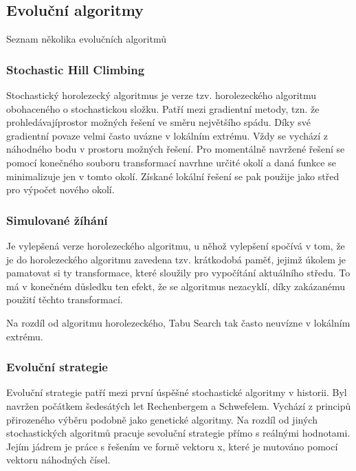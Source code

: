 \documentclass[bc,male,java,dept460]{diploma}		%
\begin{document}
\subsection{Evoluční algoritmy}
Seznam několika evolučních algoritmů

\subsubsection{Stochastic Hill Climbing}
Stochastický horolezecký algoritmus je verze tzv. horolezeckého algoritmu obohaceného o stochastickou složku. Patří mezi gradientní metody, tzn. že prohledávajíprostor možných řešení ve směru největšího spádu. Díky své gradientní povaze velmi často uvázne v lokálním extrému. Vždy se vychází z náhodného bodu v prostoru možných řešení. Pro momentálně navržené řešení se pomocí konečného souboru transformací navrhne určité okolí a daná funkce se minimalizuje jen v tomto okolí. Získané lokální řešení se pak použije jako střed pro výpočet nového okolí.

\subsubsection{Simulované žíhání}
\par Je vylepšená verze horolezeckého algoritmu, u něhož vylepšení spočívá v tom, že je do horolezeckého algoritmu zavedena tzv. krátkodobá paměť, jejimž úkolem je pamatovat si ty transformace, které sloužily pro vypočítání aktuálního středu. To má v konečném důsledku ten efekt, že se algoritmus nezacyklí, díky zakázanému použití těchto transformací.
\par Na rozdíl od algoritmu horolezeckého, Tabu Search tak často neuvízne v lokálním extrému.


\subsubsection{Evoluční strategie}
\par Evoluční strategie patří mezi první úspěšné stochastické algoritmy v historii. Byl navržen počátkem šedesátých let Rechenbergem a Schwefelem. Vychází z principů přirozeného výběru podobně jako genetické algoritmy. Na rozdíl od jiných stochastických algoritmů pracuje sevoluční strategie přímo s reálnými hodnotami. Jejím jádrem je práce s řešením ve formě vektoru x, které je mutováno pomocí vektoru náhodných čísel.
\end{document}
